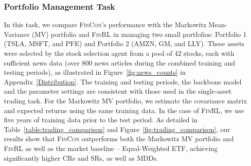 \subsubsection{Portfolio Management Task}
\label{ssec:protfolio}
In this task, we compare \textsc{FinCon}'s performance with the Markowitz Mean-Variance (MV) portfolio \cite{markowitz2000mean} and \textsc{FinRL} \cite{liu2020finrl} in managing two small portfolios: Portfolio 1 (TSLA, MSFT, and PFE) and Portfolio 2 (AMZN, GM, and LLY). These assets were selected by the stock selection agent from a pool of 42 stocks, each with sufficient news data (over 800 news articles during the combined training and testing periods), as illustrated in Figure~\ref{fig:news_counts} in Appendix~\ref{Distribution}. The training and testing periods, the backbone model and the parameter settings are consistent with those used in the single-asset trading task. For the Markowitz MV portfolio, we estimate the covariance matrix and expected returns using the same training data. In the case of \textsc{FinRL}, we use five years of training data prior to the test period. As detailed in Table~\ref{table:trading_comparison} and Figure~\ref{fig:trading_comparison}, our results show that \textsc{FinCon} outperforms both the Markowitz MV portfolio and \textsc{FinRL} as well as the market baseline -- Equal-Weighted ETF, achieving significantly higher CRs and SRs, as well as MDDs.


